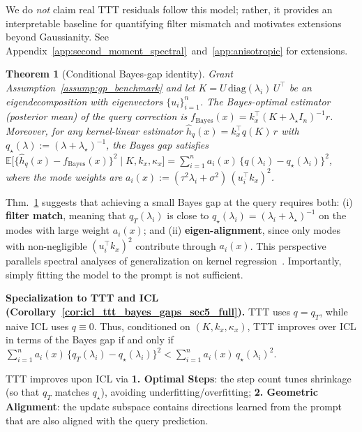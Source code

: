 \documentclass{article}
\theoremstyle{plain}
\newtheorem{theorem}{Theorem}[section]
\theoremstyle{definition}
\theoremstyle{remark}
\begin{document}
We do \emph{not} claim real TTT residuals follow this model; rather, it provides an interpretable baseline for quantifying filter mismatch and motivates extensions beyond Gaussianity. See Appendix~\ref{app:second_moment_spectral}~and~\ref{app:anisotropic} for extensions.

\begin{theorem}[Conditional Bayes-gap identity]\label{thm:predictive_gap_main}
Grant Assumption~\ref{assump:gp_benchmark} and let $K=U\,\mathrm{diag}(\lambda_i)\,U^\top$ be an eigendecomposition with eigenvectors $\{u_i\}_{i=1}^n$. The Bayes-optimal estimator (posterior mean) of the query correction is $f_{\mathrm{Bayes}}(x)=k_x^\top (K+\lambda_\star I_n)^{-1}r$. Moreover, for any kernel-linear estimator $\hat h_q(x)=k_x^\top q(K)\,r$ with $q_\star(\lambda):=(\lambda+\lambda_\star)^{-1}$, the Bayes gap satisfies $\mathbb{E}\big[\{\hat h_q(x)-f_{\mathrm{Bayes}}(x)\}^2 \mid K,k_x,\kappa_x\big]
=\sum_{i=1}^n a_i(x)\,\bigl\{q(\lambda_i)-q_\star(\lambda_i)\bigr\}^2$, where the mode weights are $a_i(x):=(\tau^2\lambda_i+\sigma^2)\,(u_i^\top k_x)^2$.
\end{theorem}

Thm.~\ref{thm:predictive_gap_main} suggests that achieving a small Bayes gap at the query requires both: (i) \textbf{filter match}, meaning that $q_T(\lambda_i)$ is close to $q_\star(\lambda_i)=(\lambda_i+\lambda_\star)^{-1}$ on the modes with large weight $a_i(x)$; and (ii) \textbf{eigen-alignment}, since only modes with non-negligible $(u_i^\top k_x)^2$ contribute through $a_i(x)$. This perspective parallels spectral analyses of generalization on kernel regression~\citep{pmlr-v119-bordelon20a}. Importantly, simply fitting the model to the prompt is not sufficient.

\textbf{Specialization to TTT and ICL (Corollary~\ref{cor:icl_ttt_bayes_gaps_sec5_full}).}
TTT uses $q=q_T$, while naive ICL uses $q\equiv 0$. Thus, conditioned on $(K,k_x,\kappa_x)$, TTT improves over ICL in terms of the Bayes gap if and only if $\sum_{i=1}^n a_i(x)\,\bigl\{q_T(\lambda_i)-q_\star(\lambda_i)\bigr\}^2 < \sum_{i=1}^n a_i(x)\,q_\star(\lambda_i)^2$.

\begin{takeawaybox}[title=\textbf{Takeaway (C1-1): When TTT helps.}]
TTT improves upon ICL via \textbf{1. Optimal Steps}: the step count tunes shrinkage (so that $q_T$ matches $q_\star$), avoiding underfitting/overfitting; \textbf{2. Geometric Alignment}: the update subspace contains directions learned from the prompt that are also aligned with the query prediction.
\end{takeawaybox}
\end{document}
